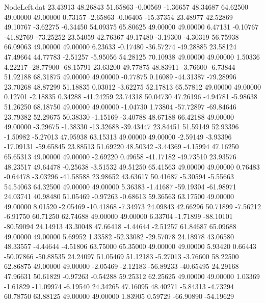 \begin{filecontents}{NodeLeft.dat}
  23.43913   48.26843   51.65863    -0.00569   -1.36657   48.34687   64.62500   49.00000   49.00000    0.73157   -2.65863   -0.06405  -15.37354
  23.48977   42.52869   49.10767    -3.62275   -6.34450   54.09375   65.80625   49.00000   49.00000    6.47131   -0.10767  -41.82769  -73.25252
  23.54059   42.76367   49.17480    -3.19300   -4.30319   56.75938   66.09063   49.00000   49.00000    6.23633   -0.17480  -36.57274  -49.28885
  23.58124   47.49664   44.77783    -2.51257   -5.95056   54.28125   70.10938   49.00000   49.00000    1.50336    4.22217  -28.77900  -68.15791
  23.63200   49.77875   48.83911    -3.76600   -6.73844   51.92188   68.31875   49.00000   49.00000   -0.77875    0.16089  -44.31387  -79.28996
  23.70268   48.87299   51.18835     0.03012   -3.62275   52.17813   65.57812   49.00000   49.00000    0.12701   -2.18835    0.34288  -41.24259
  23.74318   50.04730   47.26196    -4.94781   -5.98638   51.26250   68.18750   49.00000   49.00000   -1.04730    1.73804  -57.72897  -69.84646
  23.79382   52.29675   50.38330    -1.15169   -3.40788   48.67188   66.42188   49.00000   49.00000   -3.29675   -1.38330  -13.32688  -39.43447
  23.84451   51.59149   52.93396    -1.50982   -5.27013   47.95938   63.15313   49.00000   49.00000   -2.59149   -3.93396  -17.09131  -59.65845
  23.88513   51.69220   48.50342    -3.44369   -4.15994   47.16250   65.65313   49.00000   49.00000   -2.69220    0.49658  -41.17182  -49.73510
  23.93576   48.23517   49.64478    -0.25638   -3.51532   49.51250   65.41563   49.00000   49.00000    0.76483   -0.64478   -3.03296  -41.58588
  23.98652   43.63617   50.41687    -5.30594   -5.55663   54.54063   64.32500   49.00000   49.00000    5.36383   -1.41687  -59.19304  -61.98971
  24.03741   40.98480   51.05469    -0.97263   -0.68613   59.36563   63.17500   49.00000   49.00000    8.01520   -2.05469  -10.41868   -7.34973
  24.09843   42.66296   50.71899    -7.56212   -6.91750   60.71250   62.74688   49.00000   49.00000    6.33704   -1.71899  -88.10101  -80.59094
  24.14913   43.30048   47.66418    -4.44644   -2.51257   61.84687   65.09688   49.00000   49.00000    5.69952    1.33582  -52.33082  -29.57078
  24.18978   43.06580   48.33557    -4.44644   -4.51806   63.75000   65.35000   49.00000   49.00000    5.93420    0.66443  -50.07866  -50.88535
  24.24097   51.05469   51.12183    -5.27013   -3.76600   58.22500   62.86875   49.00000   49.00000   -2.05469   -2.12183  -56.89233  -40.65495
  24.29168   47.96631   50.61829    -0.97263   -0.54288   59.25312   62.25625   49.00000   49.00000    1.03369   -1.61829  -11.09974   -6.19540
  24.34265   47.16095   48.40271    -5.84313   -4.73294   60.78750   63.88125   49.00000   49.00000    1.83905    0.59729  -66.90890  -54.19629

\end{filecontents}
